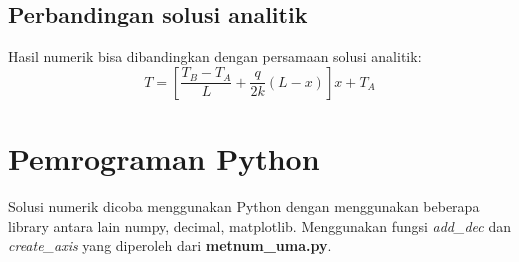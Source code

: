\documentclass[11pt]{article}
\begin{document}
\subsection{Perbandingan solusi
analitik}\label{perbandingan-solusi-analitik}

Hasil numerik bisa dibandingkan dengan persamaan solusi analitik:
\[T = \left[\frac{T_B-T_A}{L}+\frac{q}{2k}(L-x)\right]x+T_A\]

    \section{Pemrograman Python}\label{pemrograman-python}

Solusi numerik dicoba menggunakan Python dengan menggunakan beberapa
library antara lain numpy, decimal, matplotlib. Menggunakan fungsi
\emph{add\_dec} dan \emph{create\_axis} yang diperoleh dari
\textbf{metnum\_uma.py}.
\end{document}

